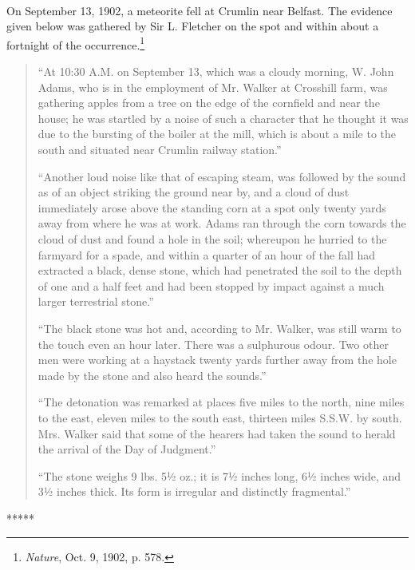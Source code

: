 \documentclass[a4paper, 12pt, oneside]{article}
\begin{document}
\paragraph{}
On September 13, 1902, a meteorite fell at Crumlin near Belfast. The evidence given below was gathered by Sir L. Fletcher on the spot and within about a fortnight of the occurrence.\footnote{\emph{Nature}, Oct. 9, 1902, p. 578.}
\begin{quotation}
``At 10:30 A.M. on September 13, which was a cloudy morning, W. John Adams, who is in the employment of Mr. Walker at Crosshill farm, was gathering apples from a tree on the edge of the cornfield and near the house; he was startled by a noise of such a character that he thought it was due to the bursting of the boiler at the mill, which is about a mile to the south and situated near Crumlin railway station.''

``Another loud noise like that of escaping steam, was followed by the sound as of an object striking the ground near by, and a cloud of dust immediately arose above the standing corn at a spot only twenty yards away from where he was at work. Adams ran through the corn towards the cloud of dust and found a hole in the soil; whereupon he hurried to the farmyard for a spade, and within a quarter of an hour of the fall had extracted a black, dense stone, which had penetrated the soil to the depth of one and a half feet and had been stopped by impact against a much larger terrestrial stone.''

``The black stone was hot and, according to Mr. Walker, was still warm to the touch even an hour later. There was a sulphurous odour. Two other men were working at a haystack twenty yards further away from the hole made by the stone and also heard the sounds.''

``The detonation was remarked at places five miles to the north, nine miles to the east, eleven miles to the south east, thirteen miles S.S.W. by south. Mrs. Walker said that some of the hearers had taken the sound to herald the arrival of the Day of Judgment.''

``The stone weighs 9 lbs. 5½ oz.; it is 7½ inches long, 6½ inches wide, and 3½ inches thick. Its form is irregular and distinctly fragmental.''
\end{quotation}
\centerline{*\hspace{15mm}*\hspace{15mm}*\hspace{15mm}*\hspace{15mm}*}
\bigskip
\end{document}
